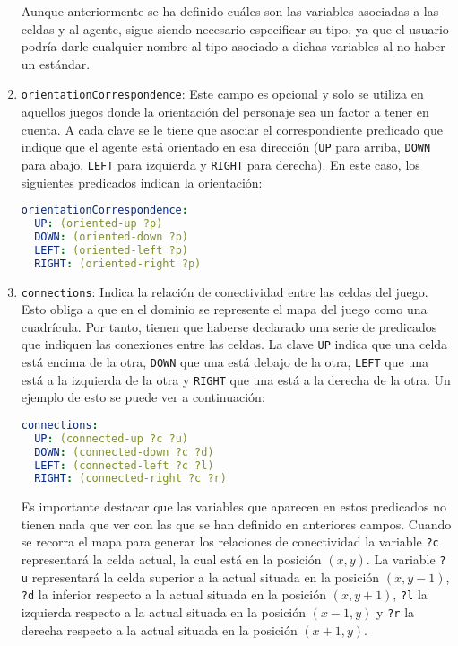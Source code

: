 \begin{enumerate}
    Aunque anteriormente se ha definido cuáles son las variables asociadas a las celdas y al agente,
    sigue siendo necesario especificar su tipo, ya que el usuario podría darle cualquier nombre al
    tipo asociado a dichas variables al no haber un estándar.
    
    \item \texttt{orientationCorrespondence}: Este campo es opcional y solo se utiliza en aquellos
    juegos donde la orientación del personaje sea un factor a tener en cuenta. A cada clave se le
    tiene que asociar el correspondiente predicado que indique que el agente está orientado en esa
    dirección (\texttt{UP} para arriba, \texttt{DOWN} para abajo, \texttt{LEFT} para izquierda
    y \texttt{RIGHT} para derecha). En este caso, los siguientes predicados indican la orientación:
    
    \begin{lstlisting}[language=yaml]
orientationCorrespondence:
  UP: (oriented-up ?p)
  DOWN: (oriented-down ?p)
  LEFT: (oriented-left ?p)
  RIGHT: (oriented-right ?p) 
    \end{lstlisting}
    
    \item \texttt{connections}: Indica la relación de conectividad entre las celdas del juego.
    Esto obliga a que en el dominio se represente el mapa del juego como una cuadrícula. Por tanto, tienen
    que haberse declarado una serie de predicados que indiquen las conexiones entre las celdas. La clave
    \texttt{UP} indica que una celda está encima de la otra, \texttt{DOWN} que una está debajo de la otra,
    \texttt{LEFT} que una está a la izquierda de la otra y \texttt{RIGHT} que una está a la derecha de
    la otra. Un ejemplo de esto se puede ver a continuación:
    
    \begin{lstlisting}[language=yaml]
connections:
  UP: (connected-up ?c ?u)
  DOWN: (connected-down ?c ?d)
  LEFT: (connected-left ?c ?l)
  RIGHT: (connected-right ?c ?r)
    \end{lstlisting}
    
    Es importante destacar que las variables que aparecen en estos predicados no tienen nada que ver
    con las que se han definido en anteriores campos. Cuando se recorra el mapa para generar los relaciones
    de conectividad la variable \texttt{?c} representará la celda actual, la cual está en la posición $(x,y)$.
    La variable \texttt{?u} representará la celda superior a la actual situada en la posición $(x, y-1)$,
    \texttt{?d} la inferior respecto a la actual situada en la posición $(x, y+1)$, \texttt{?l} la izquierda
    respecto a la actual situada en la posición $(x-1, y)$ y \texttt{?r} la derecha respecto a la actual 
    situada en la posición $(x+1, y)$.
    

\end{enumerate}

